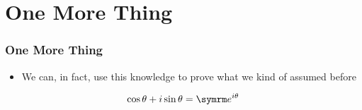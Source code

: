 \documentclass{beamer}
\begin{document}
\section{One More Thing}

\begin{frame}
  \frametitle{One More Thing}
  \begin{itemize}
    \item We can, in fact, use this knowledge to prove what we kind of assumed before
  \end{itemize}
  \begin{equation*}
    \cos \theta + i\sin \theta = \e^{i\theta}
  \end{equation*}
\end{frame}
\end{document}
